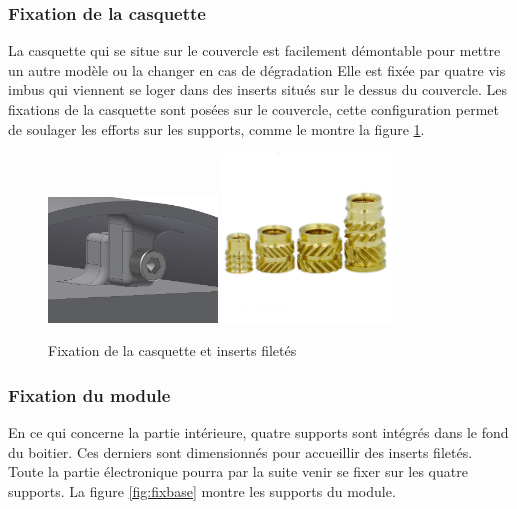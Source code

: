 \subsubsection{Fixation de la casquette}

La casquette qui se situe sur le couvercle est facilement démontable pour mettre un autre modèle ou 
la changer en cas de dégradation Elle est fixée par quatre vis imbus qui viennent se loger dans des inserts 
situés sur le dessus du couvercle. Les fixations de la casquette sont posées sur le couvercle, cette 
configuration permet de soulager les efforts sur les supports, comme le montre la figure \ref{fig:casquette}.

\begin{figure}[H]
    \centering
    \includegraphics[width=0.4\textwidth]{Images/photos_PGA/fixcasquette.PNG}
    \includegraphics[width=0.4\textwidth]{Images/photos_PGA/inserts.jpg}
    \caption{Fixation de la casquette et inserts filetés}
    \label{fig:casquette}
\end{figure}

\subsubsection{Fixation du module}

En ce qui concerne la partie intérieure, quatre supports sont intégrés dans le fond du boitier. Ces derniers 
sont dimensionnés pour accueillir des inserts filetés. Toute la partie électronique pourra par la 
suite venir se fixer sur les quatre supports. La figure \ref{fig:fixbase} montre les supports du module.

